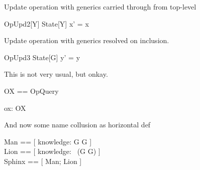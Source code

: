 \documentclass{article}
\begin{document}
Update operation with generics carried through from top-level
\begin{schema}{OpUpd2}[Y]
   \Delta State[Y]
\where
    x' = x 
\end{schema}

Update operation with generics resolved on inclusion.
\begin{schema}{OpUpd3}
   \Delta State[G]
\where
    y' = y 
\end{schema}

This is not very usual, but onkay.
\begin{zed}
   OX == \pre OpQuery
\end{zed}

\begin{axdef}
   ox: OX
\end{axdef}

And now some name collusion as horizontal def
\begin{zed} 
   Man  == [ knowledge: G \fun G ] \\
   Lion == [ knowledge: \power~(G \cross G) ] \\
   Sphinx == [ Man; Lion ]
\end{zed}
\end{document}

